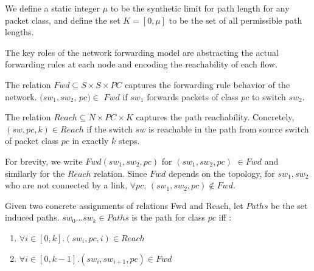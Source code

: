We define a static integer $\mu$ to be the synthetic limit for path length for any packet class, and define the set $K = [0, \mu]$ to be the set of all permissible path lengths.

The key roles of the network forwarding model are abstracting the actual forwarding rules at each node and encoding the reachability of each flow. 
\begin{mydef}
\label{def:fwd}
The relation $Fwd \subseteq S \times S \times PC $ captures the forwarding rule behavior of the network. 
$(sw_1, sw_2$, $pc)\in$ $Fwd$ if 
$sw_1$ forwards packets of class $pc$ to switch $sw_2$. 
\end{mydef}
\begin{mydef}
\label{def:reach}
	The relation $Reach \subseteq N \times PC \times K$ captures the path reachability.   
	Concretely, $(sw, pc, k)\in Reach$ if 
	the switch $sw$ is reachable in the path from source switch of packet class $pc$ in exactly $k$ steps.  
\end{mydef}
For brevity, we write $Fwd(sw_1, sw_2, pc)$ for $(sw_1, sw_2, pc) $ $\in Fwd$ and similarly for the $Reach$ relation. 
Since $Fwd$ depends on the topology,
for $sw_1, sw_2$ who are not connected by a link, $\forall pc$, $(sw_1,sw_2,pc) \notin Fwd$. 

Given two concrete assignments of relations Fwd and Reach, let $Paths$ be the set induced paths. 
$sw_0 \ldots sw_k \in Paths$ is the path for class $pc$ iff : 
\begin{enumerate}
	\item $\forall i \in [0,k]. (sw_i, pc, i) \in Reach$
	\item $\forall i \in [0, k - 1]. (sw_i, sw_{i+1}, pc) \in Fwd$
\end{enumerate}



